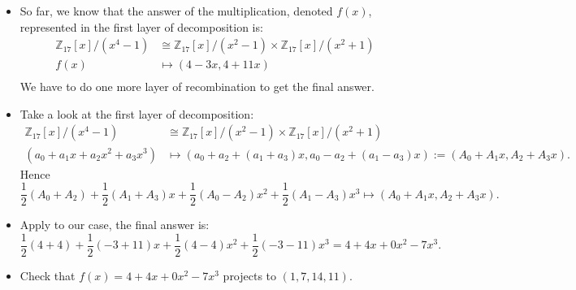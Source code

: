 \begin{frame}
    \begin{itemize}
        \item <1->So far, we know that the answer of the multiplication, denoted \(f(x)\), 
            represented in the first layer of decomposition is:
            \begin{align*}
                \mathbb{Z}_{17}[x] / (x^{4} - 1) &\cong
                \mathbb{Z}_{17}[x] / (x^2-1) \times 
                \mathbb{Z}_{17}[x] / (x^2+1) \\
                f(x) &\mapsto (4 - 3x, 4 + 11x)\\
            \end{align*}
            We have to do one more layer of recombination to get the final answer.

        \item <2->Take a look at the first layer of decomposition:
            \begin{align*}
                \mathbb{Z}_{17}[x] / (x^{4} - 1) &\cong
                \mathbb{Z}_{17}[x] / (x^2-1) \times
                \mathbb{Z}_{17}[x] / (x^2+1) \\
                (a_{0} + a_{1}x + a_{2}x^{2} + a_{3}x^{3}) &\mapsto
                (a_{0} + a_{2} + (a_{1} + a_{3})x, 
                a_{0} - a_{2} + (a_{1} - a_{3})x) := (A_{0} + A_{1}x, A_{2} + A_{3}x).
            \end{align*}
            Hence
            \[
                \frac{1}{2}(A_{0} + A_{2})  + 
                \frac{1}{2}(A_{1} + A_{3})x +
                \frac{1}{2}(A_{0} - A_{2})x^{2} +
                \frac{1}{2}(A_{1} - A_{3})x^{3} \mapsto
                (A_{0} + A_{1}x, A_{2} + A_{3}x).
            \]

        \item <3->Apply to our case, the final answer is:
            \[
                \frac{1}{2}(4 + 4) + \frac{1}{2}(-3 + 11)x + 
                \frac{1}{2}(4 - 4)x^{2} + \frac{1}{2}(-3 - 11)x^{3} = 4 + 4x + 0x^{2} - 7x^{3}.
            \]
        \item Check that \(f(x) = 4 + 4x + 0x^{2} - 7x^{3}\) projects to \( (1, 7, 14, 11)\).
    \end{itemize}
\end{frame}

